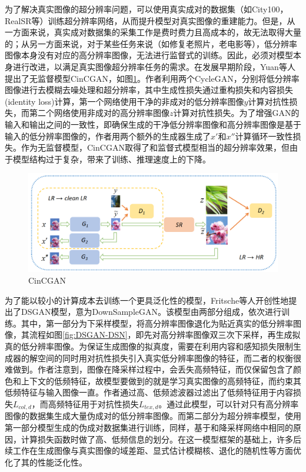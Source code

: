 为了解决真实图像的超分辨率问题，可以使用真实成对的数据集（如City100\parencite{chen2019camera}，RealSR\parencite{cai2019toward}等）训练超分辨率网络，从而提升模型对真实图像的重建能力。但是，从一方面来说，真实成对数据集的采集工作是费时费力且高成本的，故无法取得大量的；从另一方面来说，对于某些任务来说（如修复老照片，老电影等），低分辨率图像本身没有对应的高分辨率图像，无法进行监督式的训练。因此，必须对模型本身进行改进，以满足真实图像超分辨率任务的需求。在发展早期阶段，Yuan等人\parencite{yuan2018unsupervised}提出了无监督模型CinCGAN，如图\ref{fig:CinCGAN}。作者利用两个CycleGAN\parencite{zhu2017unpaired}，分别将低分辨率图像进行去模糊去噪处理和超分辨率，其中生成性损失通过重构损失和内容损失(identity loss)计算，第一个网络使用干净的非成对的低分辨率图像$y$计算对抗性损失，而第二个网络使用非成对的高分辨率图像$z$计算对抗性损失。为了增强GAN的输入和输出之间的一致性，即确保生成的干净低分辨率图像和高分辨率图像是基于输入的低分辨率图像的，作者用两个额外的生成器生成了$x'$和$x''$计算循环一致性损失。作为无监督模型，CinCGAN取得了和监督式模型相当的超分辨率效果，但由于模型结构过于复杂，带来了训练、推理速度上的下降。

\begin{figure}[htbp]
    \centering
    \includegraphics[width=1.0\textwidth]{imgs/CinCGAN.png}
    \caption{CinCGAN}
    \label{fig:CinCGAN}
\end{figure}

为了能以较小的计算成本去训练一个更具泛化性的模型，Fritsche等人\parencite{fritsche2019frequency}开创性地提出了DSGAN模型，意为DownSampleGAN。该模型由两部分组成，依次进行训练。其中，第一部分为下采样模型，将高分辨率图像退化为贴近真实的低分辨率图像，其流程如图\ref{fig:DSGAN-DSN}，即先对高分辨率图像双三次下采样，再生成拟真的低分辨率图像。为保证生成图像的拟真度，需要在利用内容和感知损失限制生成器的解空间的同时用对抗性损失引入真实低分辨率图像的特征，而二者的权衡很难做到。作者注意到，图像在降采样过程中，会丢失高频特征，而仅保留包含了颜色和上下文的低频特征，故模型要做到的就是学习真实图像的高频特征，而约束其低频特征与输入图像一直。作者通过高、低频滤波器过滤出了低频特征用于内容损失$L_{col,d}$，而高频特征用于对抗性损失$L_{tex,d}$。通过此模型，可以针对只有高分辨率图像的数据集生成大量伪成对的低分辨率图像。而第二部分为超分辨率模型，使用第一部分模型生成的伪成对数据集进行训练，同样，基于和降采样网络中相同的原因，计算损失函数时做了高、低频信息的划分。在这一模型框架的基础上，许多后续工作在生成图像与真实图像的域差距、显式估计模糊核、退化的随机性等方面优化了其的性能泛化性。

